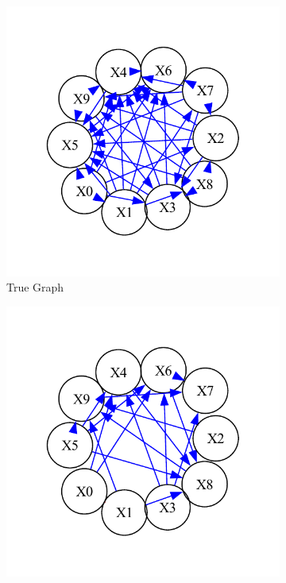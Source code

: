 \documentclass{article}
\begin{document}
\begin{figure}[H]
    \centering
    \begin{subfigure}{0.45\textwidth}
        \centering
        \vspace{-0.5cm}
        \includegraphics[width=\linewidth]{postprocess/test_data/20241018_020318_base_nodes10_samples2000/output_graph/true_graph.pdf}
        \vfill
        \caption{True Graph}
        \label{fig:sub1}
    \end{subfigure}
    \hspace{0.04\textwidth}
    \begin{subfigure}{0.45\textwidth}
        \centering
        \vspace{-0.5cm}
        \includegraphics[width=\linewidth]{postprocess/test_data/20241018_020318_base_nodes10_samples2000/output_graph/initial_graph.pdf}

\end{subfigure}
\end{figure}
\end{document}
